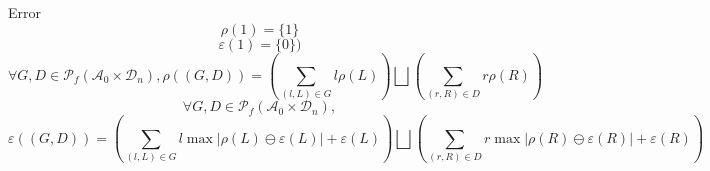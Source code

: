 \begin{frame}{Error}
    $$\rho(\boxed{1}) = \{1\}$$
    $$\varepsilon(\boxed{1}) = \{0\})$$
    $$\forall G, D \in \mathscr{P}_f(\mathcal{A}_0 \times \mathcal{D}_n),
    \rho((G, D))
    = \left(\sum_{(l, L) \in G} l \rho(L) \right) \bigsqcup \left(\sum_{(r, R) \in D} r \rho(R) \right)$$
    $$
    \forall G, D \in \mathscr{P}_f(\mathcal{A}_0 \times \mathcal{D}_n),$$
    $$\varepsilon((G, D))
    = \left(\sum_{(l, L) \in G} l \max|\rho(L) \ominus \varepsilon(L)| + \varepsilon(L)\right)
    \bigsqcup \left(\sum_{(r, R) \in D} r \max|\rho(R) \ominus \varepsilon(R)| + \varepsilon(R)\right)
    $$
\end{frame}